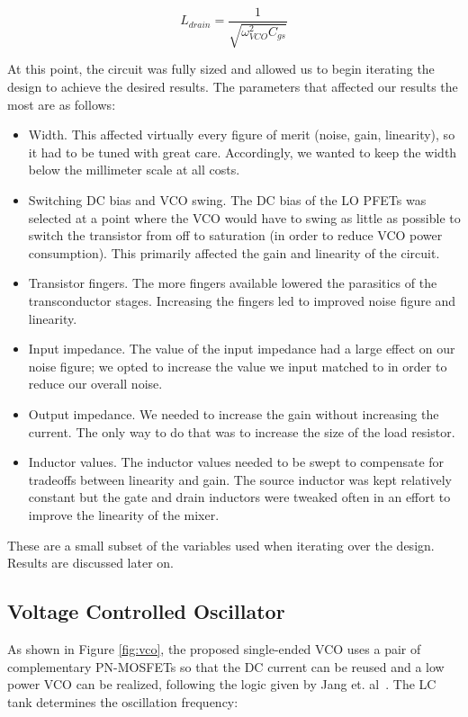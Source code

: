 \begin{equation}
L_{drain} = \frac{1}{\sqrt{\omega^{2}_{VCO}C_{gs}}}
\end{equation}

At this point, the circuit was fully sized and allowed us to begin iterating the design to achieve the desired results.
The parameters that affected our results the most are as follows:

\begin{itemize}
	\item Width. This affected virtually every figure of merit (noise, gain, linearity), so it had to be tuned with great care. Accordingly, we wanted to keep the width below the millimeter scale at all costs.
	\item Switching DC bias and VCO swing. The DC bias of the LO PFETs was selected at a point where the VCO would have to swing as little as possible to switch the transistor from off to saturation (in order to reduce VCO power consumption). This primarily affected the gain and linearity of the circuit.
	\item Transistor fingers. The more fingers available lowered the parasitics of the transconductor stages. Increasing the fingers led to improved noise figure and linearity.
	\item Input impedance. The value of the input impedance had a large effect on our noise figure; we opted to increase the value we input matched to in order to reduce our overall noise.
	\item Output impedance. We needed to increase the gain without increasing the current. The only way to do that was to increase the size of the load resistor.
	\item Inductor values. The inductor values needed to be swept to compensate for tradeoffs between linearity and gain. The source inductor was kept relatively constant but the gate and drain inductors were tweaked often in an effort to improve the linearity of the mixer.
\end{itemize}

These are a small subset of the variables used when iterating over the design. Results are discussed later on.

\subsection{Voltage Controlled Oscillator}
As shown in Figure \ref{fig:vco}, the proposed single-ended VCO uses a pair of complementary PN-MOSFETs so that the DC current can be reused and a low power VCO can be realized, following the logic given by Jang et. al~\cite{vco}. The LC tank determines the oscillation frequency:

